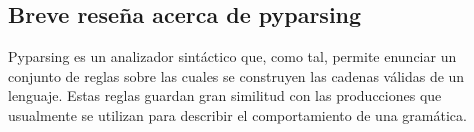 \documentclass[a4paper]{report}
\begin{document}


\subsection*{Breve reseña acerca de pyparsing}

Pyparsing es un analizador sintáctico que, como tal, permite enunciar un conjunto de reglas sobre las cuales se construyen las cadenas válidas de un lenguaje. Estas reglas guardan gran similitud con las producciones que usualmente se utilizan para describir el comportamiento de una gramática. 
\end{document}
